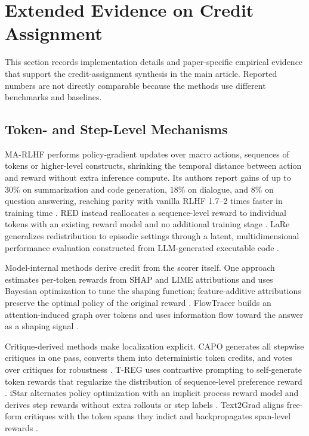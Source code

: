 \section{Extended Evidence on Credit Assignment}
\label{supp:credit}

This section records implementation details and paper-specific empirical evidence that support the credit-assignment synthesis in the main article. Reported numbers are not directly comparable because the methods use different benchmarks and baselines.

\subsection{Token- and Step-Level Mechanisms}

MA-RLHF performs policy-gradient updates over macro actions, sequences of tokens or higher-level constructs, shrinking the temporal distance between action and reward without extra inference compute. Its authors report gains of up to 30\% on summarization and code generation, 18\% on dialogue, and 8\% on question answering, reaching parity with vanilla RLHF 1.7--2 times faster in training time \citep{chai2024marlhf}. RED instead reallocates a sequence-level reward to individual tokens with an existing reward model and no additional training stage \citep{li2024red}. LaRe generalizes redistribution to episodic settings through a latent, multidimensional performance evaluation constructed from LLM-generated executable code \citep{qu2024latent}.

Model-internal methods derive credit from the scorer itself. One approach estimates per-token rewards from SHAP and LIME attributions and uses Bayesian optimization to tune the shaping function; feature-additive attributions preserve the optimal policy of the original reward \citep{koo2025learning}. FlowTracer builds an attention-induced graph over tokens and uses information flow toward the answer as a shaping signal \citep{dong2026how}.

Critique-derived methods make localization explicit. CAPO generates all stepwise critiques in one pass, converts them into deterministic token credits, and votes over critiques for robustness \citep{xie2025capo}. T-REG uses contrastive prompting to self-generate token rewards that regularize the distribution of sequence-level preference reward \citep{zhou2024treg}. iStar alternates policy optimization with an implicit process reward model and derives step rewards without extra rollouts or step labels \citep{liu2025agenticreinforcementlearningimplicit}. Text2Grad aligns free-form critiques with the token spans they indict and backpropagates span-level rewards \citep{wang2026text2gradreinforcementlearningnatural}.

